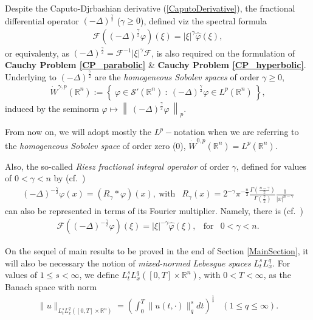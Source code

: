\documentclass{amsart}
\theoremstyle{definition}
\theoremstyle{remark}
\numberwithin{equation}{section}
\newcommand{\BR}{{\mathbb R}}
\begin{document}
Despite the Caputo-Djrbashian derivative (\ref{CaputoDerivative}), the fractional differential operator $(-\Delta)^{\frac{\gamma}{2}}$ ($\gamma\geq 0$), defined viz the spectral formula
\begin{eqnarray}
	\label{RieszOperators}
	\mathcal{F}\left((-\Delta)^{\frac{\gamma}{2}}\varphi\right)(\xi)=|\xi|^\gamma \widehat{\varphi}(\xi),
\end{eqnarray}
or equivalenty, as $(-\Delta)^{\frac{\gamma}{2}}=\mathcal{F}^{-1}|\xi|^{\gamma}\mathcal{F}$,
is also required on the formulation of {\bf Cauchy Problem \ref{CP_parabolic}} \& {\bf Cauchy Problem \ref{CP_hyperbolic}}. Underlying to $(-\Delta)^{\frac{\gamma}{2}}$ are the 
{\it homogeneous Sobolev spaces} of order $\gamma\geq 0$,
\begin{eqnarray*}
	\label{SobolevHomogeneous}	\dot{W}^{\gamma,p}(\BR^n):=\left\{~\varphi\in \mathcal{S}'(\BR^n)~:~(-\Delta)^{\frac{\gamma}{2}}\varphi\in L^p(\BR^n)~\right\},
\end{eqnarray*}
induced by the seminorm $\displaystyle\varphi\mapsto \left\|~(-\Delta)^{\frac{\gamma}{2}}\varphi~\right\|_{p}$.

From now on, we will adopt mostly the $L^p-$notation when we are referring to the {\it homogeneous Sobolev space} of order zero (0), $\displaystyle \dot{W}^{0,p}(\BR^n)={L}^p(\BR^n)$. 

Also, the so-called {\it Riesz fractional integral operator} of order $\gamma$, defined for values of $0<\gamma<n$ by (cf.~\cite[Section 25]{samko1993fractional})
\begin{eqnarray}
	\label{RieszIntegral}(-\Delta)^{-\frac{\gamma}{2}}\varphi(x)=(R_\gamma\ast\varphi)(x),~\mbox{with}&\displaystyle R_\gamma(x)=2^{-\gamma}\pi^{-\frac{n}{2}}\frac{\Gamma\left(\frac{n-\gamma}{2}\right)}{\Gamma\left(\frac{\gamma}{2}\right)}\frac{1}{|x|^{n-\gamma}}
\end{eqnarray}
can also be represented in terms of its Fourier multiplier. Namely, there is (cf.~\cite[Theorem 25.1]{samko1993fractional})
\begin{eqnarray*}
	\mathcal{F}\left((-\Delta)^{-\frac{\gamma}{2}}\varphi\right)(\xi)=|\xi|^{-\gamma} \widehat{\varphi}(\xi), & \mbox{for} & 0<\gamma<n.
\end{eqnarray*}




On the sequel of main results to be proved in the end of Section \ref{MainSection}, it will also be necessary the notion of {\it mixed-normed Lebesgue spaces} $L^s_tL^q_x$. For values of $1\leq s<\infty$, we define $L^s_tL^q_x([0,T]\times \BR^n)$, with $0<T<\infty$, as the Banach space with norm
\begin{eqnarray}
	\label{mixedNorm}\| u\|_{L^s_tL^q_x([0,T]\times \BR^n)}=\left(\int_0^T \|u(t,\cdot)\|_q^s dt\right)^{\frac{1}{s}}& (1\leq q\leq \infty).
\end{eqnarray}
\end{document}
